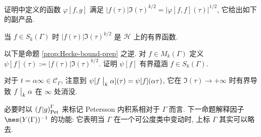 证明中定义的函数 $\varphi[f, g]$ 满足 $|f(\tau)| \Im(\tau)^{k/2} = \left|\varphi[f,f](\tau)\right|^{1/2}$, 它给出如下的副产品.

\begin{proposition}\label{prop:Hecke-bound-prep}
	当 $f \in S_k(\Gamma)$ 时 $|f(\tau)| \Im(\tau)^{k/2}$ 是 $\mathcal{H}$ 上的有界函数.
\end{proposition}

\begin{exercise}
	以下是命题 \ref{prop:Hecke-bound-prep} 之逆. 对 $f \in M_k(\Gamma)$ 定义 $\psi[f](\tau) := |f(\tau)| \Im(\tau)^{k/2}$. 证明 $\psi[f]$ 有界蕴涵 $f \in S_k(\Gamma)$.
	
	\begin{hint}
		对于 $t = \alpha \infty \in \mathcal{C}_\Gamma$, 注意到 $\psi[f \;\big|_{k} \; \alpha](\tau) = \psi[f](\alpha\tau)$, 它在 $\Im(\tau) \to +\infty$ 时有界导致 $f \;\big|_{k} \; \alpha$ 在 $\infty$ 处消没.
	\end{hint}
\end{exercise}


必要时以 $\left( f \middle| g \right)_{\mathrm{Pet}}^\Gamma$ 来标记 Petersson 内积系相对于 $\Gamma$ 而言. 下一命题解释因子 $\mes(Y(\Gamma))^{-1}$ 的功能: 它表明当 $\Gamma$ 在一个可公度类中变动时, 上标 $\Gamma$ 其实可以略去.

